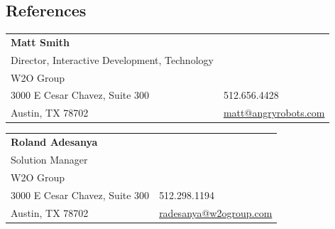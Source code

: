 \documentclass[margin,line]{resume}
\begin{document}
\begin{resume}



\section{\mysidestyle References}

\begin{tabular}{@{}p{9cm}p{3cm}}
\textbf{Matt Smith}\\
Director, Interactive Development, Technology\\
W2O Group\\
3000 E Cesar Chavez, Suite 300                 &  512.656.4428\\
Austin, TX 78702                     &  \href{mailto:matt@angryrobots.com}{matt@angryrobots.com}\\
\end{tabular}

\begin{tabular}{@{}p{9cm}p{3cm}}
\textbf{Roland Adesanya}\\
Solution Manager\\
W2O Group\\
3000 E Cesar Chavez, Suite 300                 &  512.298.1194\\
Austin, TX 78702                     &  \href{mailto:radesanya@w2ogroup.com}{radesanya@w2ogroup.com}\\
\end{tabular}



\end{resume}
\end{document}
